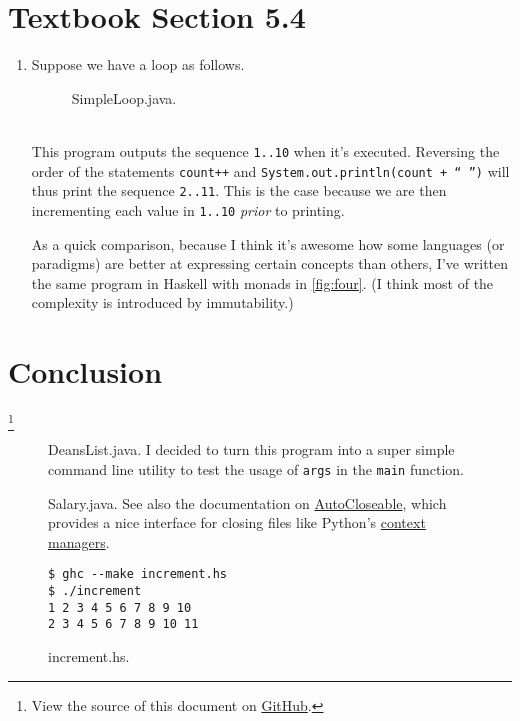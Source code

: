 \documentclass[leqno, 11pt]{article}
\newcommand\blfootnote[1]{%
  \begingroup
    \renewcommand\thefootnote{}\footnote{#1}
    \addtocounter{footnote}{-1}
  \endgroup
}
\begin{document}
\section*{Textbook Section 5.4}
\begin{enumerate}
  \item Suppose we have a loop as follows.
        \begin{figure}[h!]
          \centering
          
          \caption{SimpleLoop.java.}
          \label{fig:three}
        \end{figure}\\
        This program outputs the sequence \texttt{1..10} when it's executed. Reversing the order of the statements \texttt{count++} and \texttt{System.out.println(count + `` '')} will thus print the sequence \texttt{2..11}. This is the case because we are then incrementing each value in \texttt{1..10} \textit{prior} to printing. 
        
        As a quick comparison, because I think it's awesome how some languages (or paradigms) are better at expressing certain concepts than others, I've written the same program in Haskell with monads in \autoref{fig:four}. (I think most of the complexity is introduced by immutability.)
\end{enumerate}
\section*{Conclusion}
\blfootnote{View the source of this document on \href{https://github.com/bjd2385/IFT_194_labs/blob/master/\jobname.tex}{GitHub}.}
\newpage
\begin{figure}
  \centering
  
  \caption{DeansList.java. I decided to turn this program into a super simple command line utility to test the usage of \texttt{args} in the \texttt{main} function.}
  \label{fig:one}
\end{figure}
\begin{figure}
  \centering
  
  \caption{Salary.java. See also the documentation on \href{https://docs.oracle.com/javase/10/docs/api/java/lang/AutoCloseable.html}{AutoCloseable}, which provides a nice interface for closing files like Python's \href{https://docs.python.org/3/reference/compound_stmts.html\#with}{context managers}.}
  \label{fig:two}
\end{figure}
\begin{figure}
  \centering
  
  \begin{verbatim}
$ ghc --make increment.hs
$ ./increment
1 2 3 4 5 6 7 8 9 10
2 3 4 5 6 7 8 9 10 11
  \end{verbatim}
  \caption{increment.hs.}
  \label{fig:four}
\end{figure}
\end{document}

